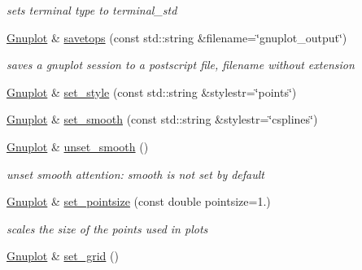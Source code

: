 \begin{DoxyCompactItemize}
\begin{DoxyCompactList}\small\item\em sets terminal type to terminal\+\_\+std \end{DoxyCompactList}\item 
\hyperlink{classkukadu_1_1Gnuplot}{Gnuplot} \& \hyperlink{classkukadu_1_1Gnuplot_ae6857197036b0739d792b5aa3833c673}{savetops} (const std\+::string \&filename=\char`\"{}gnuplot\+\_\+output\char`\"{})\hypertarget{classkukadu_1_1Gnuplot_ae6857197036b0739d792b5aa3833c673}{}\label{classkukadu_1_1Gnuplot_ae6857197036b0739d792b5aa3833c673}

\begin{DoxyCompactList}\small\item\em saves a gnuplot session to a postscript file, filename without extension \end{DoxyCompactList}\item 
\hyperlink{classkukadu_1_1Gnuplot}{Gnuplot} \& \hyperlink{classkukadu_1_1Gnuplot_a168775b6cf04b25a621886d2f0f85806}{set\+\_\+style} (const std\+::string \&stylestr=\char`\"{}points\char`\"{})
\item 
\hyperlink{classkukadu_1_1Gnuplot}{Gnuplot} \& \hyperlink{classkukadu_1_1Gnuplot_a8b8849a77a1c674c30e4e5f8d59f8308}{set\+\_\+smooth} (const std\+::string \&stylestr=\char`\"{}csplines\char`\"{})
\item 
\hyperlink{classkukadu_1_1Gnuplot}{Gnuplot} \& \hyperlink{classkukadu_1_1Gnuplot_abbebd88fffd2654ff192d6222f4d8e65}{unset\+\_\+smooth} ()
\begin{DoxyCompactList}\small\item\em unset smooth attention\+: smooth is not set by default \end{DoxyCompactList}\item 
\hyperlink{classkukadu_1_1Gnuplot}{Gnuplot} \& \hyperlink{classkukadu_1_1Gnuplot_ab1033881b0494423cd292c5084bf3925}{set\+\_\+pointsize} (const double pointsize=1.)\hypertarget{classkukadu_1_1Gnuplot_ab1033881b0494423cd292c5084bf3925}{}\label{classkukadu_1_1Gnuplot_ab1033881b0494423cd292c5084bf3925}

\begin{DoxyCompactList}\small\item\em scales the size of the points used in plots \end{DoxyCompactList}\item 
\hyperlink{classkukadu_1_1Gnuplot}{Gnuplot} \& \hyperlink{classkukadu_1_1Gnuplot_aebcefffa35cefd5e4e0cffab0f3b5a6a}{set\+\_\+grid} ()\hypertarget{classkukadu_1_1Gnuplot_aebcefffa35cefd5e4e0cffab0f3b5a6a}{}\label{classkukadu_1_1Gnuplot_aebcefffa35cefd5e4e0cffab0f3b5a6a}


\end{DoxyCompactItemize}
